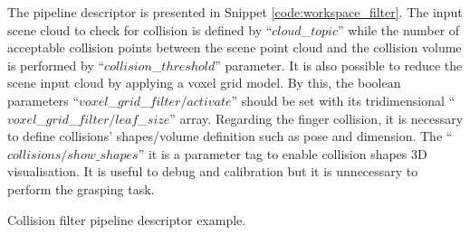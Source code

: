 The pipeline descriptor is presented in Snippet \ref{code:workspace_filter}. The input scene cloud to check for collision is defined by ``$cloud$\_$topic$'' while the number of acceptable collision points between the scene point cloud and the collision volume is performed by ``$collision$\_$threshold$'' parameter. It is also possible to reduce the scene input cloud by applying a voxel grid model. By this, the boolean parameters ``$voxel$\_$grid$\_$filter/activate$'' should be set with its tridimensional ``$voxel$\_$grid$\_$filter/leaf$\_$size$'' array. Regarding the finger collision, it is necessary to define  collisions' shapes/volume definition such as pose and dimension. The ``$collisions/show\_shapes$'' it is a parameter tag to enable collision shapes 3D visualisation. It is useful to debug and calibration but it is unnecessary to perform the grasping task.




%

\begin{snippet}[h!]
\centering
{}
\caption{Collision filter pipeline descriptor example.}
\label{code:collision_filter}
\end{snippet}


